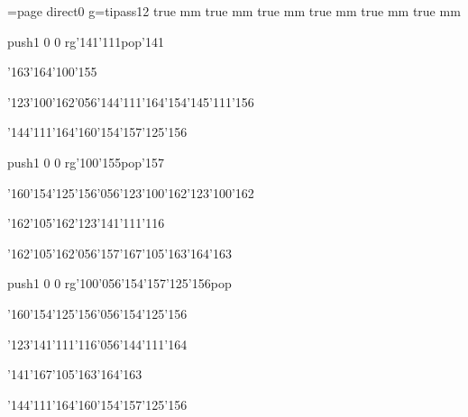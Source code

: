 \chardef\match=\pdfcolorstackinit page direct{0 g}\nopagenumbers\font\ipa=tipass12 true mm true mm true mm true mm true mm true mm
\null\vfill\ipa\centerline{\enskip\pdfcolorstack\match push{1 0 0 rg}\char'141\char'111\pdfcolorstack\match pop{}\enskip\enskip\enskip\enskip\char'141\enskip\enskip\enskip\enskip\enskip}\medskip\centerline{\enskip\char'163\char'164\char'100\char'155\enskip\enskip\enskip\enskip\enskip\enskip\enskip\enskip\enskip\enskip\enskip\enskip\enskip\enskip\enskip}\medskip\centerline{\enskip\enskip\enskip\char'123\char'100\char'162\char'056\char'144\char'111\char'164\enskip\char'154\char'145\char'111\char'156\enskip\enskip\enskip\enskip}\medskip\centerline{\enskip\enskip\enskip\enskip\enskip\enskip\enskip\enskip\enskip\enskip\enskip\enskip\enskip\enskip}\medskip\centerline{\enskip\enskip\enskip\char'144\char'111\char'164\enskip\enskip\enskip\enskip\char'160\char'154\char'157\char'125\char'156}\medskip\vfill\footline{\hfil\tt\folio\hfil}\eject
\null\vfill\ipa\centerline{\enskip\enskip\enskip\enskip\pdfcolorstack\match push{1 0 0 rg}\char'100\char'155\pdfcolorstack\match pop{}\enskip\char'157\enskip\enskip\enskip\enskip\enskip}\medskip\centerline{\enskip\char'160\char'154\char'125\char'156\char'056\char'123\char'100\char'162\enskip\enskip\enskip\enskip\enskip\enskip\enskip\enskip\char'123\char'100\char'162}\medskip\centerline{\enskip\enskip\enskip\enskip\enskip\enskip\char'162\char'105\char'162\enskip\char'123\char'141\char'111\char'116\enskip\enskip\enskip\enskip}\medskip\centerline{\enskip\char'162\char'105\char'162\char'056\char'157\enskip\enskip\enskip\enskip\enskip\char'167\char'105\char'163\char'164\char'163}\medskip\centerline{\enskip\enskip\enskip\enskip\enskip\enskip\enskip\enskip\enskip\enskip\enskip\enskip\enskip\enskip}\medskip\vfill\footline{\hfil\tt\folio\hfil}\eject
\null\vfill\ipa\centerline{\enskip\enskip\enskip\enskip\enskip\enskip\enskip\pdfcolorstack\match push{1 0 0 rg}\char'100\char'056\char'154\char'157\char'125\char'156\pdfcolorstack\match pop{}}\medskip\centerline{\enskip\char'160\char'154\char'125\char'156\char'056\char'154\char'125\char'156\enskip\enskip\enskip\enskip\enskip\enskip\enskip\enskip\enskip\enskip\enskip}\medskip\centerline{\enskip\enskip\enskip\enskip\enskip\enskip\enskip\enskip\enskip\enskip\char'123\char'141\char'111\char'116\char'056\char'144\char'111\char'164}\medskip\centerline{\enskip\enskip\enskip\enskip\char'141\enskip\enskip\enskip\enskip\enskip\char'167\char'105\char'163\char'164\char'163}\medskip\centerline{\enskip\enskip\enskip\char'144\char'111\char'164\enskip\enskip\enskip\enskip\char'160\char'154\char'157\char'125\char'156}\medskip\vfill\footline{\hfil\tt\folio\hfil}\eject
